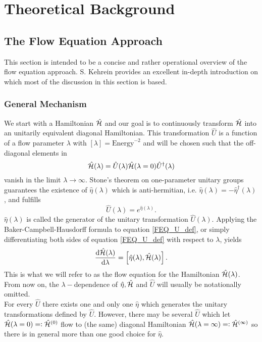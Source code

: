 \chapter{Theoretical Background}\label{Theoretical Background}
\section{The Flow Equation Approach}
This section is intended to be a concise and rather operational overview of the flow equation approach. S. Kehrein provides an excellent in-depth introduction \cite{kehrein2006flow} on which most of the discussion in this section is based.
\subsection{General Mechanism}\label{General Mechanism}
We start with a Hamiltonian $\hat{\mathcal{H}}$ and our goal is to continuously transform $\hat{\mathcal{H}}$ into an unitarily equivalent diagonal Hamiltonian. This transformation $\hat U$ is a function of a flow parameter $\lambda$ with $\left[\lambda\right]=\mathrm{Energy}^{-2}$ and will be chosen such that the off-diagonal elements in  
\begin{equation}\label{FEQ_U_def}
\hat{\mathcal{H}}(\lambda)=\hat U(\lambda)\hat{\mathcal{H}} (\lambda = 0)\hat U^\dagger (\lambda)
\end{equation}
vanish in the limit $\lambda\rightarrow\infty$. Stone's theorem on one-parameter unitary groups guarantees the existence of $\hat \eta(\lambda)$ which is anti-hermitian, i.e. $\hat\eta(\lambda) = -\hat\eta^\dagger(\lambda)$, and fulfills 
\begin{equation}
\hat U(\lambda) = e^{\hat\eta(\lambda)}.
\end{equation} 
$\hat\eta(\lambda)$ is called the generator of the unitary transformation $\hat U(\lambda)$. Applying the Baker-Campbell-Hausdorff formula to equation \ref{FEQ_U_def}, or simply differentiating both sides of equation \ref{FEQ_U_def} with respect to $\lambda$, yields
\begin{equation}\label{FEQ_ODE_def}
\frac{\mathrm d\hat{\mathcal{H}}(\lambda)}{\mathrm d\lambda} = \left[\hat\eta(\lambda),\hat{\mathcal{H}}(\lambda)\right].
\end{equation}
This is what we will refer to as the flow equation for the Hamiltonian $\hat{\mathcal{H}} (\lambda)$. From now on, the $\lambda-$dependence of $\hat\eta,\hat{\mathcal{H}}$ and $\hat U$ will usually be notationally omitted. \\
For every $\hat U$ there exists one and only one $\hat\eta$ which generates the unitary transformations defined by $\hat U$. However, there may be several $\hat U$ which let $\hat{\mathcal{H}}(\lambda = 0)=\vcentcolon \hat{\mathcal{H}}^{(0)}$ flow to (the same) diagonal Hamiltonian $\hat{\mathcal{H}}(\lambda=\infty)=\vcentcolon \hat{\mathcal{H}}^{(\infty)}$ so there is in general more than one good choice for $\hat\eta$. \\
